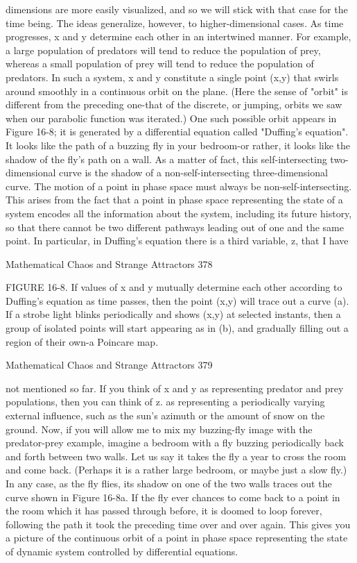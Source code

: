 dimensions are more easily visualized, and so we will stick with that case for the time
being. The ideas generalize, however, to higher-dimensional cases.
        As time progresses, x and y determine each other in an intertwined manner.
For example, a large population of predators will tend to reduce the population of
prey, whereas a small population of prey will tend to reduce the population of
predators. In such a system, x and y constitute a single point (x,y) that swirls around
smoothly in a continuous orbit on the plane. (Here the sense of "orbit" is different
from the preceding one-that of the discrete, or jumping, orbits we saw when our
parabolic function was iterated.) One such possible orbit appears in Figure 16-8; it is
generated by a differential equation called "Duffing's equation". It looks like the path
of a buzzing fly in your bedroom-or rather, it looks like the shadow of the fly's path
on a wall. As a matter of fact, this self-intersecting two-dimensional curve is the
shadow of a non-self-intersecting three-dimensional curve. The motion of a point in
phase space must always be non-self-intersecting. This arises from the fact that a
point in phase space representing the state of a system encodes all the information
about the system, including its future history, so that there cannot be two different
pathways leading out of one and the same point.
In particular, in Duffing's equation there is a third variable, z, that I have




Mathematical Chaos and Strange Attractors                                           378

FIGURE 16-8. If values of x and y mutually determine each other according to
Duffing's equation as time passes, then the point (x,y) will trace out a curve (a). If a
strobe light blinks periodically and shows (x,y) at selected instants, then a group of
isolated points will start appearing as in (b), and gradually filling out a region of
their own-a Poincare map.




Mathematical Chaos and Strange Attractors                                           379

not mentioned so far. If you think of x and y as representing predator and prey
populations, then you can think of z. as representing a periodically varying external
influence, such as the sun's azimuth or the amount of snow on the ground. Now, if
you will allow me to mix my buzzing-fly image with the predator-prey example,
imagine a bedroom with a fly buzzing periodically back and forth between two walls.
Let us say it takes the fly a year to cross the room and come back. (Perhaps it is a
rather large bedroom, or maybe just a slow fly.) In any case, as the fly flies, its
shadow on one of the two walls traces out the curve shown in Figure 16-8a. If the fly
ever chances to come back to a point in the room which it has passed through before,
it is doomed to loop forever, following the path it took the preceding time over and
over again. This gives you a picture of the continuous orbit of a point in phase space
representing the state of dynamic system controlled by differential equations.

